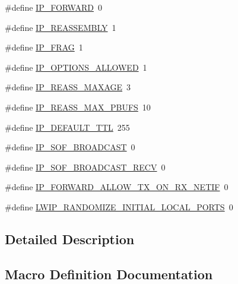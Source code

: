 \begin{DoxyCompactItemize}
\item 
\#define \hyperlink{group__lwip__opts__ipv4_ga881d32ff5ee02af01f758953f1b51d59}{I\+P\+\_\+\+F\+O\+R\+W\+A\+RD}~0
\item 
\#define \hyperlink{group__lwip__opts__ipv4_ga1a31ab0e0f37b17d40fa7c35bc2c4f69}{I\+P\+\_\+\+R\+E\+A\+S\+S\+E\+M\+B\+LY}~1
\item 
\#define \hyperlink{group__lwip__opts__ipv4_gaf85c8bdd5035b6cada790b4cc2a209a4}{I\+P\+\_\+\+F\+R\+AG}~1
\item 
\#define \hyperlink{group__lwip__opts__ipv4_gaa956b0167c37a2265b55e2d0204a3933}{I\+P\+\_\+\+O\+P\+T\+I\+O\+N\+S\+\_\+\+A\+L\+L\+O\+W\+ED}~1
\item 
\#define \hyperlink{group__lwip__opts__ipv4_gad41122bd0b5485a18a4415c8f953727b}{I\+P\+\_\+\+R\+E\+A\+S\+S\+\_\+\+M\+A\+X\+A\+GE}~3
\item 
\#define \hyperlink{group__lwip__opts__ipv4_ga29084a46d7d4be30e8029d356bca0394}{I\+P\+\_\+\+R\+E\+A\+S\+S\+\_\+\+M\+A\+X\+\_\+\+P\+B\+U\+FS}~10
\item 
\#define \hyperlink{group__lwip__opts__ipv4_ga556b9b58fd02c0fdd126791baef77411}{I\+P\+\_\+\+D\+E\+F\+A\+U\+L\+T\+\_\+\+T\+TL}~255
\item 
\#define \hyperlink{group__lwip__opts__ipv4_ga0b2c993fd940f5774108298933310384}{I\+P\+\_\+\+S\+O\+F\+\_\+\+B\+R\+O\+A\+D\+C\+A\+ST}~0
\item 
\#define \hyperlink{group__lwip__opts__ipv4_ga0f1fbf42d3344bf87cd056d48ddca3db}{I\+P\+\_\+\+S\+O\+F\+\_\+\+B\+R\+O\+A\+D\+C\+A\+S\+T\+\_\+\+R\+E\+CV}~0
\item 
\#define \hyperlink{group__lwip__opts__ipv4_ga9e761df07c4e93901858741d4771dbc7}{I\+P\+\_\+\+F\+O\+R\+W\+A\+R\+D\+\_\+\+A\+L\+L\+O\+W\+\_\+\+T\+X\+\_\+\+O\+N\+\_\+\+R\+X\+\_\+\+N\+E\+T\+IF}~0
\item 
\#define \hyperlink{group__lwip__opts__ipv4_gafd988b31749b30c65009c8ddf6c0a58d}{L\+W\+I\+P\+\_\+\+R\+A\+N\+D\+O\+M\+I\+Z\+E\+\_\+\+I\+N\+I\+T\+I\+A\+L\+\_\+\+L\+O\+C\+A\+L\+\_\+\+P\+O\+R\+TS}~0
\end{DoxyCompactItemize}


\subsection{Detailed Description}


\subsection{Macro Definition Documentation}
\mbox{\label{group__lwip__opts__ipv4_ga556b9b58fd02c0fdd126791baef77411}} 
